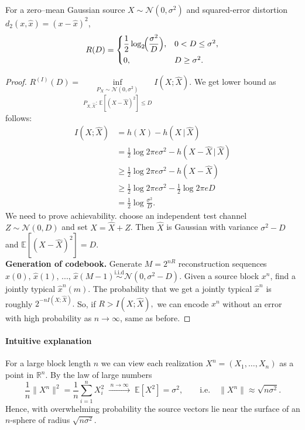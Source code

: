 \begin{example}

For a zero–mean Gaussian source \(X\sim\mathcal N(0,\sigma^{2})\) and
squared-error distortion \(d_2(x,\widehat x)=(x-\widehat x)^{2}\),
\[
R(D)=
\begin{cases}
\displaystyle\frac12\log_{2}\!\Bigl(\frac{\sigma^{2}}{D}\Bigr),
        & 0<D\le\sigma^{2},\\[6pt]
0,      & D\ge\sigma^{2}.
\end{cases}
\]

\begin{proof}
\(R^{(I)}(D)=\underset{P_{X,\widehat X}:\,\mathbb{E}[(X-\widehat X)^2]\leq D}{\underset{P_X\sim\mathcal{N}(0,\sigma^2)}{\inf}}I(X;\widehat X)\). We get lower bound as follows:
\[
\begin{aligned}
    I(X;\widehat X)&=h(X)-h(X\,|\,\widehat X)\\
    &=\frac12\log2\pi e\sigma^2-h(X-\widehat X\,|\,\widehat X)\\&\geq\frac12\log2\pi e\sigma^2-h(X-\widehat{X})\\&\geq\frac12\log2\pi e\sigma^2-\frac12\log2\pi eD\\&=\frac12\log\frac{\sigma^2}{D}.
\end{aligned}
\]
We need to prove achievability. choose an independent test channel \(Z\sim\mathcal N(0,D)\) and set
\(X=\widehat X+Z\). Then \(\widehat X\) is Gaussian with variance \(\sigma^{2}-D\) and \(\mathbb E[(X-\widehat X)^{2}]=D\).\\  

\noindent\textbf{Generation of codebook.}
Generate $M=2^{nR}$ reconstruction sequences $\widehat{x}(0),\,\widehat{x}(1),\,...,\,\widehat{x}(M-1) \overset{\text{i.i.d}}{\sim}\mathcal{N}(0,\sigma^2-D)$. Given a source block $x^n$, find a jointly typical $\widehat x^n(m)$. The probability that we get a jointly typical $\widehat x^n$ is roughly $2^{-nI(X;\widehat X)}.$ So, if $R>I(X;\widehat X),$ we can encode $x^n$ without an error with high probability as $n\to\infty$, same as before.
\end{proof}
\end{example}

\paragraph{Intuitive explanation}\label{subsec:intuition}

For a large block length \(n\) we can view each realization
\(
X^{n}=(X_{1},\dots,X_{n})
\)
as a point in \(\mathbb R^{n}\).
By the law of large numbers
\[
\frac1n\|X^{n}\|^{2}
    =\frac1n\sum_{i=1}^{n}X_{i}^{2}
    \;\xrightarrow{\;n\to\infty\;}\;
    \mathbb E[X^{2}]
    =\sigma^{2},
\qquad
\text{i.e.}\quad
\|X^{n}\|\approx\sqrt{n\sigma^{2}}.
\]
Hence, with overwhelming probability the source vectors lie near the
surface of an \(n\)-sphere of radius \(\sqrt{n\sigma^{2}}\).

